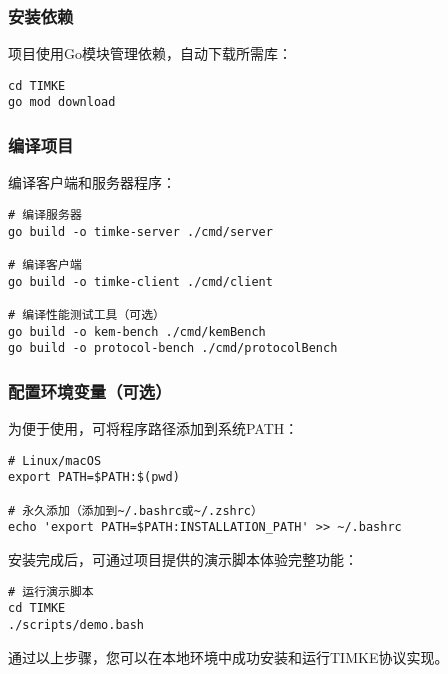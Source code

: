 \subsubsection{安装依赖}

项目使用Go模块管理依赖，自动下载所需库：

\begin{verbatim}
cd TIMKE
go mod download
\end{verbatim}

\subsubsection{编译项目}

编译客户端和服务器程序：

\begin{verbatim}
# 编译服务器
go build -o timke-server ./cmd/server

# 编译客户端
go build -o timke-client ./cmd/client

# 编译性能测试工具（可选）
go build -o kem-bench ./cmd/kemBench
go build -o protocol-bench ./cmd/protocolBench
\end{verbatim}

\subsubsection{配置环境变量（可选）}

为便于使用，可将程序路径添加到系统PATH：

\begin{verbatim}
# Linux/macOS
export PATH=$PATH:$(pwd)

# 永久添加（添加到~/.bashrc或~/.zshrc）
echo 'export PATH=$PATH:INSTALLATION_PATH' >> ~/.bashrc
\end{verbatim}

安装完成后，可通过项目提供的演示脚本体验完整功能：

\begin{verbatim}
# 运行演示脚本
cd TIMKE
./scripts/demo.bash
\end{verbatim}
通过以上步骤，您可以在本地环境中成功安装和运行TIMKE协议实现。